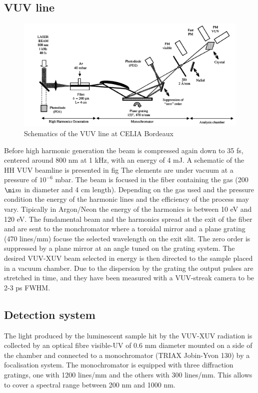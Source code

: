 \subsection{VUV line}

\begin{figure}[htbp]
\begin{center}
\includegraphics[width=12cm]{../Pictures/Chapter_7/VUV_line.png}
\end{center}
\caption[VUV line]{Schematics of the VUV line at CELIA Bordeaux}
\label{fig:VUV_line}
\end{figure}
Before high harmonic generation the beam is compressed again down to 35 fs, centered around 800 nm at 1 kHz, with an energy of 4 mJ.
A schematic of the HH VUV beamline is presented in fig
The elements are under vacuum at a pressure of $10^{-6}$ mbar. The beam is focused in the fiber containing the gas (200$\mi m$ in diameter and 4 cm length). Depending on the gas used and the pressure condition the energy of the harmonic lines and the efficiency of the process may vary. Tipically in Argon/Neon the energy of the harmonics is between 10 eV and 120 eV.
The fundamental beam and the harmonics spread at the exit of the fiber and are sent to the monchromator where a toroidal mirror and a plane grating (470 lines/mm) focuse the selected wavelength on the exit slit.
The zero order is suppressed by a plane mirror at an angle tuned on the grating system.
The desired VUV-XUV beam selected in energy is then directed to the sample placed in a vacuum chamber. Due to the dispersion by the grating the output pulses are stretched in time, and they have been measured with a VUV-streak camera to be 2-3 ps FWHM.

\subsection{Detection system}
The light produced by the luminescent sample hit by the VUV-XUV radiation is collected by an optical fibre visible-UV of 0.6 mm diameter mounted on a side of the chamber and connected to a monochromator (TRIAX Jobin-Yvon 130) by a focalisation system.
The monochromator is equipped with three diffraction gratings, one with 1200 lines/mm and the others with 300 lines/mm. This allows to cover a spectral range between 200 nm and 1000 nm.

